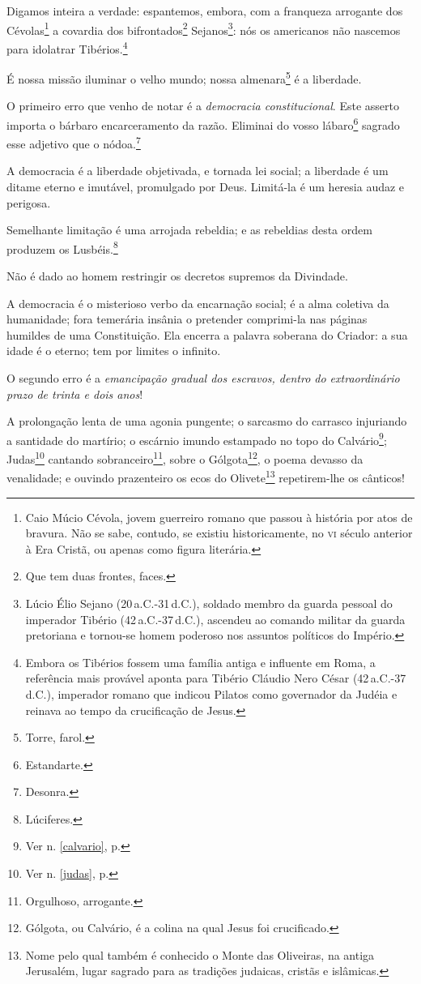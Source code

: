 Digamos inteira a verdade: espantemos, embora, com a franqueza arrogante
dos Cévolas\footnote{Caio Múcio Cévola, jovem guerreiro romano que
  passou à história por atos de bravura. Não se sabe, contudo, se
  existiu historicamente, no \textsc{vi} século anterior à Era Cristã, ou apenas
  como figura literária.} a covardia dos bifrontados\footnote{Que tem
  duas frontes, faces.} Sejanos\footnote{Lúcio Élio Sejano (20\,a.C.-31\,d.C.), 
  soldado membro da guarda pessoal do imperador Tibério (42\,a.C.-37\,d.C.), 
  ascendeu ao comando militar da guarda pretoriana e tornou-se
  homem poderoso nos assuntos políticos do Império.}: nós os americanos
não nascemos para idolatrar Tibérios.\footnote{Embora os Tibérios
  fossem uma família antiga e influente em Roma, a referência mais
  provável aponta para Tibério Cláudio Nero César (42\,a.C.-37\,d.C.),
  imperador romano que indicou Pilatos como governador da Judéia e
  reinava ao tempo da crucificação de Jesus.}

É nossa missão iluminar o velho mundo; nossa almenara\footnote{Torre,
  farol.} é a liberdade.

O primeiro erro que venho de notar é a \emph{democracia constitucional}.
Este asserto importa o bárbaro encarceramento da razão. Eliminai do
vosso lábaro\footnote{Estandarte.} sagrado esse adjetivo que o
nódoa.\footnote{Desonra.}

A democracia é a liberdade objetivada, e tornada lei social; a liberdade
é um ditame eterno e imutável, promulgado por Deus. Limitá-la é um
heresia audaz e perigosa.

Semelhante limitação é uma arrojada rebeldia; e as rebeldias desta ordem
produzem os Lusbéis.\footnote{Lúciferes.}

Não é dado ao homem restringir os decretos supremos da Divindade.

A democracia é o misterioso verbo da encarnação social; é a alma
coletiva da humanidade; fora temerária insânia o pretender comprimi-la
nas páginas humildes de uma Constituição. Ela encerra a palavra soberana
do Criador: a sua idade é o eterno; tem por limites o infinito.

O segundo erro é a \emph{emancipação gradual dos escravos, dentro do
extraordinário prazo de trinta e dois anos}!

A prolongação lenta de uma agonia pungente; o sarcasmo do carrasco
injuriando a santidade do martírio; o escárnio imundo estampado no topo
do Calvário\footnote{Ver n. \ref{calvario}, p. \pageref{calvario}}; 
Judas\footnote{Ver n. \ref{judas}, p. \pageref{judas}} 
  cantando sobranceiro\footnote{Orgulhoso, arrogante.}, sobre
o Gólgota\footnote{Gólgota, ou Calvário, é a colina na qual Jesus foi
  crucificado.}, o poema devasso da venalidade; e ouvindo prazenteiro os
ecos do Olivete\footnote{Nome pelo qual também é conhecido o Monte das
  Oliveiras, na antiga Jerusalém, lugar sagrado para as tradições
  judaicas, cristãs e islâmicas.} repetirem-lhe os cânticos!

